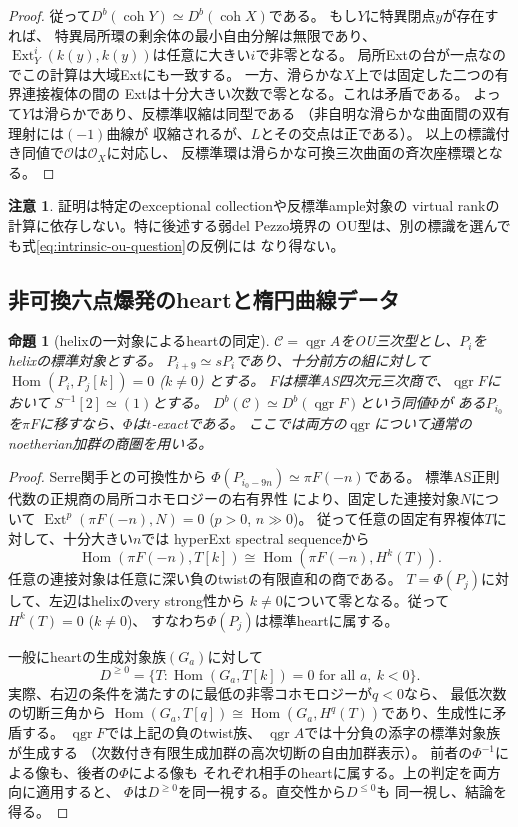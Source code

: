 \documentclass[11pt,a4paper]{ltjsarticle}
\newtheorem{proposition}[theorem]{命題}
\theoremstyle{definition}
\newtheorem{remark}[theorem]{注意}
\newcommand{\qgr}{\operatorname{qgr}}
\newcommand{\coh}{\operatorname{coh}}
\begin{document}
\begin{proof}
従って$D^b(\coh Y)\simeq D^b(\coh X)$である。
もし$Y$に特異閉点$y$が存在すれば、
特異局所環の剰余体の最小自由分解は無限であり、
$\operatorname{Ext}^i_Y(k(y),k(y))$は任意に大きい$i$で非零となる。
局所Extの台が一点なのでこの計算は大域Extにも一致する。
一方、滑らかな$X$上では固定した二つの有界連接複体の間の
Extは十分大きい次数で零となる。これは矛盾である。
よって$Y$は滑らかであり、反標準収縮は同型である
（非自明な滑らかな曲面間の双有理射には$(-1)$曲線が
収縮されるが、$L$とその交点は正である）。
以上の標識付き同値で$\mathcal O$は$\mathcal O_X$に対応し、
反標準環は滑らかな可換三次曲面の斉次座標環となる。
\end{proof}

\begin{remark}
証明は特定のexceptional collectionや反標準ample対象の
virtual rankの計算に依存しない。特に後述する弱del Pezzo境界の
OU型は、別の標識を選んでも式\eqref{eq:intrinsic-ou-question}の反例には
なり得ない。
\end{remark}

\subsection{非可換六点爆発のheartと楕円曲線データ}
\label{subsec:ou-blowup-heart}

\begin{proposition}[helixの一対象によるheartの同定]\label{prop:helix-heart-upgrade}
$\mathcal C=\qgr A$をOU三次型とし、$P_i$をhelixの標準対象とする。
$P_{i+9}\simeq sP_i$であり、十分前方の組に対して
$\operatorname{Hom}(P_i,P_j[k])=0$ ($k\ne0$) とする。
$F$は標準AS四次元三次商で、$\qgr F$において
$S^{-1}[2]\simeq(1)$とする。
$D^b(\mathcal C)\simeq D^b(\qgr F)$という同値$\Phi$が
ある$P_{i_0}$を$\pi F$に移すなら、$\Phi$は$t$-exactである。
ここでは両方の$\qgr$について通常のnoetherian加群の商圏を用いる。
\end{proposition}
\begin{proof}
Serre関手との可換性から
$\Phi(P_{i_0-9n})\simeq\pi F(-n)$である。
標準AS正則代数の正規商の局所コホモロジーの右有界性
\cite[Theorem~4.2]{YZ1997}により、固定した連接対象$N$について
$\operatorname{Ext}^{p}(\pi F(-n),N)=0$ ($p>0$, $n\gg0$)。
従って任意の固定有界複体$T$に対して、十分大きい$n$では
hyperExt spectral sequenceから
\[
 \operatorname{Hom}(\pi F(-n),T[k])
 \cong\operatorname{Hom}(\pi F(-n),H^k(T)).
\]
任意の連接対象は任意に深い負のtwistの有限直和の商である。
$T=\Phi(P_j)$に対して、左辺はhelixのvery strong性から
$k\ne0$について零となる。従って$H^k(T)=0$ ($k\ne0$)、
すなわち$\Phi(P_j)$は標準heartに属する。

一般にheartの生成対象族$(G_a)$に対して
\[
 D^{\ge0}=\{T:\operatorname{Hom}(G_a,T[k])=0
                      \text{ for all }a,\ k<0\}.
\]
実際、右辺の条件を満たすのに最低の非零コホモロジーが$q<0$なら、
最低次数の切断三角から
$\operatorname{Hom}(G_a,T[q])\cong
\operatorname{Hom}(G_a,H^q(T))$であり、生成性に矛盾する。
$\qgr F$では上記の負のtwist族、
$\qgr A$では十分負の添字の標準対象族が生成する
（次数付き有限生成加群の高次切断の自由加群表示）。
前者の$\Phi^{-1}$による像も、後者の$\Phi$による像も
それぞれ相手のheartに属する。上の判定を両方向に適用すると、
$\Phi$は$D^{\ge0}$を同一視する。直交性から$D^{\le0}$も
同一視し、結論を得る。
\end{proof}
\end{document}
